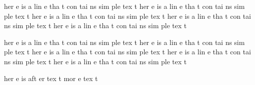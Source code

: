 her
e
is
a
lin
e
tha
t
con
tai
ns
sim
ple
tex
t
her
e
is
a
lin
e
tha
t
con
tai
ns
sim
ple
tex
t
her
e
is
a
lin
e
tha
t
con
tai
ns
sim
ple
tex
t
her
e
is
a
lin
e
tha
t
con
tai
ns
sim
ple
tex
t
her
e
is
a
lin
e
tha
t
con
tai
ns
sim
ple
tex
t %

her
e
is
a
lin
e
tha
t
con
tai
ns
sim
ple
tex
t
her
e
is
a
lin
e
tha
t
con
tai
ns
sim
ple
tex
t
her
e
is
a
lin
e
tha
t
con
tai
ns
sim
ple
tex
t
her
e
is
a
lin
e
tha
t
con
tai
ns
sim
ple
tex
t
her
e
is
a
lin
e
tha
t
con
tai
ns
sim
ple
tex
t%

her
e
is
aft
er
tex
t
mor
e
tex
t %
